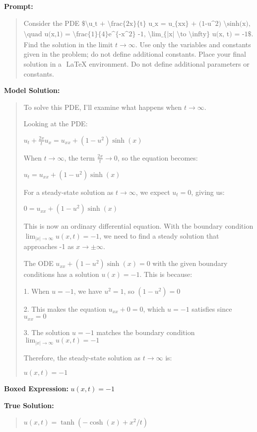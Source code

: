 \documentclass{article}
\begin{document}
\textbf{Prompt:}
\begin{quote}
Consider the PDE $\u_t + \frac{2x}{t} u_x = u_{xx} + (1-u^2) \sinh(x), \quad u(x,1) = \frac{1}{4}e^{-x^2} -1, \lim_{|x| \to \infty} u(x, t) = -1$. Find the solution in the limit $t \to \infty$. Use only the variables and constants given in the problem; do not define additional constants. Place your final solution in a $\boxed{}$ LaTeX environment. Do not define additional parameters or constants.
\end{quote}
\textbf{Model Solution:}
\begin{quote}
To solve this PDE, I'll examine what happens when $t \to \infty$.



Looking at the PDE:

$u_t + \frac{2x}{t} u_x = u_{xx} + (1-u^2) \sinh(x)$



When $t \to \infty$, the term $\frac{2x}{t} \to 0$, so the equation becomes:

$u_t = u_{xx} + (1-u^2) \sinh(x)$



For a steady-state solution as $t \to \infty$, we expect $u_t = 0$, giving us:

$0 = u_{xx} + (1-u^2) \sinh(x)$



This is now an ordinary differential equation. With the boundary condition $\lim_{|x| \to \infty} u(x, t) = -1$, we need to find a steady solution that approaches -1 as $x \to \pm\infty$.



The ODE $u_{xx} + (1-u^2) \sinh(x) = 0$ with the given boundary conditions has a solution $u(x) = -1$. This is because:

1. When $u = -1$, we have $u^2 = 1$, so $(1-u^2) = 0$

2. This makes the equation $u_{xx} + 0 = 0$, which $u = -1$ satisfies since $u_{xx} = 0$

3. The solution $u = -1$ matches the boundary condition $\lim_{|x| \to \infty} u(x, t) = -1$



Therefore, the steady-state solution as $t \to \infty$ is:



$\boxed{u(x,t) = -1}$
\end{quote}
\textbf{Boxed Expression:} $u(x,t) = -1$

\textbf{True Solution:}
\begin{quote}
$u(x,t) = \tanh(-\cosh(x) + x^2/t)$
\end{quote}
\end{document}
